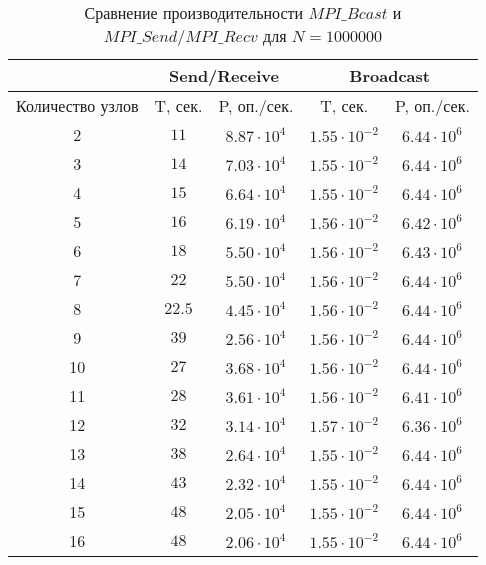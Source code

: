			\begin{table}
				\caption{Сравнение производительности $ MPI\_Bcast $ и $ MPI\_Send/MPI\_Recv $ для $ N = 1000000$}
				\label{talbe:bcast}
				\begin{tabular}{|c|c|c|c|c|}
					\hline 
					& \multicolumn{2}{c|}{Send/Receive}  & \multicolumn{2}{c|}{Broadcast} \\ 
					\hline 
					\multicolumn{1}{|m{2.5cm}|}{Количество узлов} & T, сек. & P, оп./сек. & T, сек. & P, оп./сек. \\ 
					\hline 
					2 & $11 $ & $ 8.87 \cdot 10^4 $ & $ 1.55 \cdot 10^{-2} $ & $6.44 \cdot 10^6$ \\ 
					\hline 
					3 & $14 $ & $ 7.03 \cdot 10^4 $ & $ 1.55 \cdot 10^{-2} $ & $6.44 \cdot 10^6$ \\ 
					\hline 
					4 & $15 $ & $ 6.64 \cdot 10^4 $ & $ 1.55 \cdot 10^{-2} $ & $6.44 \cdot 10^6$ \\ 
					\hline 
					5 & $16 $ & $ 6.19 \cdot 10^4 $ & $ 1.56 \cdot 10^{-2} $ & $6.42 \cdot 10^6$ \\ 
					\hline 
					6 & $18 $ & $ 5.50 \cdot 10^4 $ & $ 1.56 \cdot 10^{-2} $ & $6.43 \cdot 10^6$ \\ 
					\hline 
					7 & $22 $ & $ 5.50 \cdot 10^4 $ & $ 1.56 \cdot 10^{-2} $ & $6.44 \cdot 10^6$ \\ 
					\hline 
					8 & $22.5 $ & $ 4.45 \cdot 10^4 $ & $ 1.56 \cdot 10^{-2} $ & $6.44 \cdot 10^6$ \\ 
					\hline 
					9 & $39 $ & $ 2.56 \cdot 10^4 $ & $ 1.56 \cdot 10^{-2} $ & $6.44 \cdot 10^6$ \\ 
					\hline 
					10 & $27 $ & $ 3.68 \cdot 10^4 $ & $ 1.56 \cdot 10^{-2} $ & $6.44 \cdot 10^6$ \\ 
					\hline
					11 & $28 $ & $ 3.61 \cdot 10^4 $ & $ 1.56 \cdot 10^{-2} $ & $6.41 \cdot 10^6$ \\  
					\hline 
					12 & $32 $ & $ 3.14 \cdot 10^4 $ & $ 1.57 \cdot 10^{-2} $ & $6.36 \cdot 10^6$ \\  
					\hline 
					13 & $38 $ & $ 2.64 \cdot 10^4 $ & $ 1.55 \cdot 10^{-2} $ & $6.44 \cdot 10^6$ \\ 
					\hline 
					14 & $43 $ & $ 2.32 \cdot 10^4 $ & $ 1.55 \cdot 10^{-2} $ & $6.44 \cdot 10^6$ \\ 
					\hline 
					15 & $48 $ & $ 2.05 \cdot 10^4 $ & $ 1.55 \cdot 10^{-2} $ & $6.44 \cdot 10^6$ \\ 
					\hline 
					16 & $48 $ & $ 2.06 \cdot 10^4 $ & $ 1.55 \cdot 10^{-2} $ & $6.44 \cdot 10^6$ \\ 
					\hline 
				\end{tabular} 
			\end{table}
		
